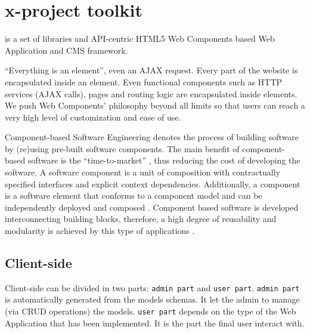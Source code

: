 \section{x-project toolkit}
 is a set of libraries and API-centric HTML5 Web Components based Web Application and CMS framework.



``Everything is an element'', even an AJAX request. Every part of the website is encapsulated inside an element. Even functional components such as HTTP services (AJAX calls), pages and routing logic are encapsulated inside elements. We push Web Components' philosophy beyond all limits so that users can reach a very high level of customization and ease of use.

Component-based Software Engineering denotes the process of building software by (re)using pre-built software components. The main benefit of component-based software is the ``time-to-market'' \cite{4773208}, thus reducing the cost of developing the software. A software component is a unit of composition with contractually specified interfaces and explicit context dependencies. 
Additionally, a component is a software element that conforms to a component model and can be independently deployed and composed \cite{Heineman:2001:CSE:379381}. 
Component based software is developed interconnecting building blocks, therefore, a high degree of reusability and modularity is achieved by this type of applications \cite{914739}. 






\subsection{Client-side}

Client-side can be divided in two parts: \texttt{admin part} and \texttt{user part}.
\texttt{admin part} is automatically generated from the models schemas. It let the admin to manage (via CRUD operations) the models.
\texttt{user part} depends on the type of the Web Application that has been implemented.
It is the part the final user interact with.


